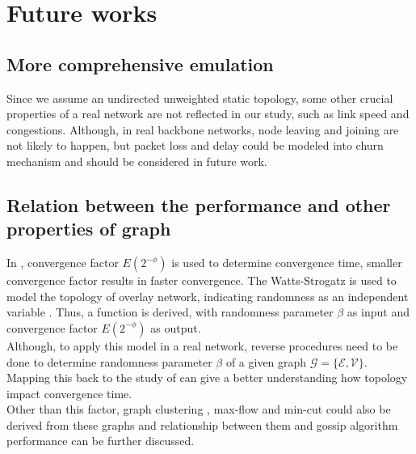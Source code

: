 \documentclass[11pt,a4paper]{article}
\begin{document}
\section{Future works}

\subsection{More comprehensive emulation}
Since we assume an undirected unweighted static topology, some other crucial properties of a real network are not reflected in our study, such as link speed and congestions. Although, in real backbone networks, node leaving and joining are not likely to happen, but packet loss and delay could be modeled into churn mechanism and should be considered in future work.\\

\subsection{Relation between the performance and other properties of graph}
In \cite{jelasity_gossip-based_2005}, convergence factor $E(2^{-\phi})$ is used to determine convergence time, smaller convergence factor results in faster convergence. The Watts-Strogatz is used to model the topology of overlay network, indicating randomness as an independent variable \cite{Watts1998}. Thus, a function is derived, with randomness parameter $\beta$ as input and convergence factor $E(2^{-\phi})$ as output.\\
Although, to apply this model in a real network, reverse procedures need to be done to determine randomness parameter $\beta$ of a given graph $\mathcal{G}=\{\mathcal{E}, \mathcal{V}\}$. Mapping this back to the study of \cite{jelasity_gossip-based_2005} can give a better understanding how topology impact convergence time.\\
Other than this factor, graph clustering \cite{Schaeffer200727}, max-flow and min-cut \cite{PapadimitriouS82} could also be derived from these graphs and relationship between them and gossip algorithm performance can be further discussed.\\
\end{document}
